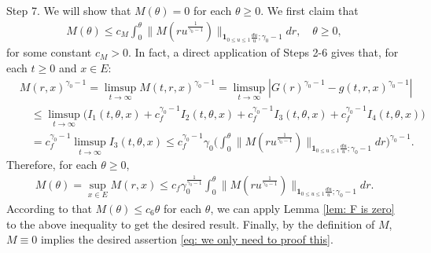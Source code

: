 	Step 7. We will show that $M(\theta) = 0$ for each $\theta \geq 0$.
	We first claim that
\begin{align}
	M(\theta)
	\leq c_M\int_0^\theta  \big\| M(r u^{\frac{1}{\gamma_0 - 1}}) \big\|_{\mathbf 1_{0\leq u\leq 1}\frac{du}{u};\gamma_0 - 1}  dr ,
	\quad \theta \geq 0,
\end{align}
	for some constant $c_M > 0$.
	In fact, a direct application of Steps 2-6 gives that, for each $t\geq 0$ and $x\in E$:
\begin{align}
	&M(r,x)^{\gamma_0 - 1}
	=\limsup_{t\to \infty} M(t,r,x)^{\gamma_0 - 1}
	= \limsup_{t\to \infty}|G(r)^{\gamma_0 - 1} - g(t,r,x)^{\gamma_0 - 1}|
	\\&\quad \leq \limsup_{t\to \infty} \big( I_1(t,\theta,x) +c^{\gamma_0 - 1}_f I_2(t,\theta,x) +c^{\gamma_0 - 1}_f I_3(t,\theta,x) + c^{\gamma_0 - 1}_f I_4(t,\theta,x) \big)
	\\& \quad = c_f^{\gamma_0 - 1} \limsup_{t\to \infty} I_3(t,\theta ,x)
	\leq c_f^{\gamma_0 - 1} \gamma_0 \Big(  \int_0^\theta  \big\| M(r u^{\frac{1}{\gamma_0 - 1}}) \big\|_{\mathbf 1_{0\leq u\leq 1}\frac{du}{u};\gamma_0 - 1}  dr\Big)^{\gamma_0 - 1}.
\end{align}
	Therefore, for each $\theta \geq 0$,
\begin{align}
	M(\theta)
	= \sup_{x\in E}  M(r,x)
	\leq c_f \gamma_0^{\frac{1}{\gamma_0 - 1}} \int_0^\theta  \big\| M(r u^{\frac{1}{\gamma_0 - 1}}) \big\|_{\mathbf 1_{0\leq u\leq 1}\frac{du}{u};\gamma_0 - 1}  dr.
\end{align}
	According to that $M(\theta) \leq c_6 \theta$ for each $\theta$, we can apply Lemma \ref{lem: F is zero} to the above inequality to get the desired result.
	Finally, by the definition of $M$,  $M\equiv 0$ implies the desired assertion \eqref{eq: we only need to proof this}.